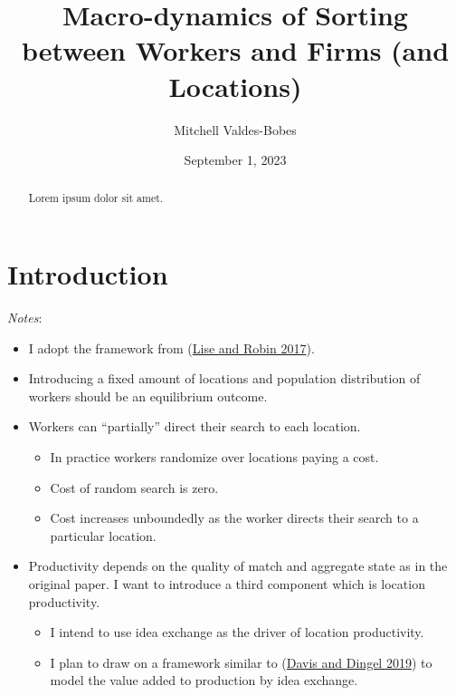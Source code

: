 \documentclass[
  letterpaper,
  DIV=11,
  numbers=noendperiod]{scrreprt}
\title{Macro-dynamics of Sorting between Workers and Firms (and
Locations)}
\author{Mitchell Valdes-Bobes}
\date{September 1, 2023}
\providecommand{\tightlist}{%
  \setlength{\itemsep}{0pt}\setlength{\parskip}{0pt}}\usepackage{longtable,booktabs,array}
\renewcommand*\contentsname{Table of contents}
\newcommand\contentsname{Table of contents}
\begin{document}
\maketitle
\begin{abstract}
Lorem ipsum dolor sit amet.
\end{abstract}
\ifdefined\Shaded\renewenvironment{Shaded}{\begin{tcolorbox}[enhanced, breakable, interior hidden, frame hidden, sharp corners, boxrule=0pt, borderline west={3pt}{0pt}{shadecolor}]}{\end{tcolorbox}}\fi

\renewcommand*\contentsname{Table of contents}
{
\hypersetup{linkcolor=}
\setcounter{tocdepth}{2}
\tableofcontents
}

\hypertarget{introduction}{%
\chapter{Introduction}\label{introduction}}

\emph{Notes}:

\begin{itemize}
\tightlist
\item
  I adopt the framework from
  (\protect\hyperlink{ref-liseMacrodynamicsSortingWorkers2017}{Lise and
  Robin 2017}).
\item
  Introducing a fixed amount of locations and population distribution of
  workers should be an equilibrium outcome.
\item
  Workers can ``partially'' direct their search to each location.

  \begin{itemize}
  \tightlist
  \item
    In practice workers randomize over locations paying a cost.
  \item
    Cost of random search is zero.
  \item
    Cost increases unboundedly as the worker directs their search to a
    particular location.
  \end{itemize}
\item
  Productivity depends on the quality of match and aggregate state as in
  the original paper. I want to introduce a third component which is
  location productivity.

  \begin{itemize}
  \tightlist
  \item
    I intend to use idea exchange as the driver of location
    productivity.
  \item
    I plan to draw on a framework similar to
    (\protect\hyperlink{ref-davisSpatialKnowledgeEconomy2019}{Davis and
    Dingel 2019}) to model the value added to production by idea
    exchange.
  \end{itemize}
\end{itemize}
\end{document}
